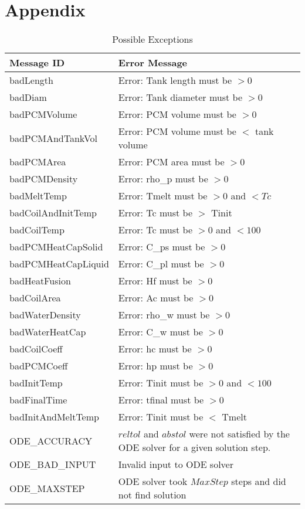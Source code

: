 \documentclass[12pt]{article}
\begin{document}
\section{Appendix} \label{Appendix}
\renewcommand{\arraystretch}{1.2}
\begin{longtable}{l p{12cm}}
\caption{Possible Exceptions} \\
\toprule
\textbf{Message ID} & \textbf{Error Message} \\
\midrule
badLength & Error: Tank length must be $> 0$ \\
badDiam & Error: Tank diameter must be $> 0$ \\
badPCMVolume & Error: PCM volume must be $> 0$ \\
badPCMAndTankVol & Error: PCM volume must be $<$ tank volume \\
badPCMArea & Error: PCM area must be $> 0$ \\
badPCMDensity & Error: rho\_p must be $> 0$ \\
badMeltTemp & Error: Tmelt must be $> 0$ and $< Tc$ \\
badCoilAndInitTemp & Error: Tc must be $>$ Tinit \\
badCoilTemp & Error: Tc must be $> 0$ and $< 100$ \\
badPCMHeatCapSolid & Error: C\_ps must be $> 0$ \\
badPCMHeatCapLiquid & Error: C\_pl must be $> 0$ \\
badHeatFusion & Error: Hf must be $> 0$ \\
badCoilArea & Error: Ac must be $> 0$ \\
badWaterDensity & Error: rho\_w must be $> 0$ \\
badWaterHeatCap & Error: C\_w must be $> 0$ \\
badCoilCoeff & Error: hc must be $> 0$ \\
badPCMCoeff & Error: hp must be $> 0$ \\
badInitTemp & Error: Tinit must be $> 0$ and $< 100$ \\
badFinalTime & Error: tfinal must be $> 0$ \\
badInitAndMeltTemp & Error: Tinit must be $<$ Tmelt \\
ODE\_ACCURACY & $reltol$ and $abstol$ were not satisfied by the ODE solver for a given solution step. \\
ODE\_BAD\_INPUT & Invalid input to ODE solver \\
ODE\_MAXSTEP & ODE solver took $MaxStep$ steps and did not find solution \\
\bottomrule
\end{longtable}
\end{document}
